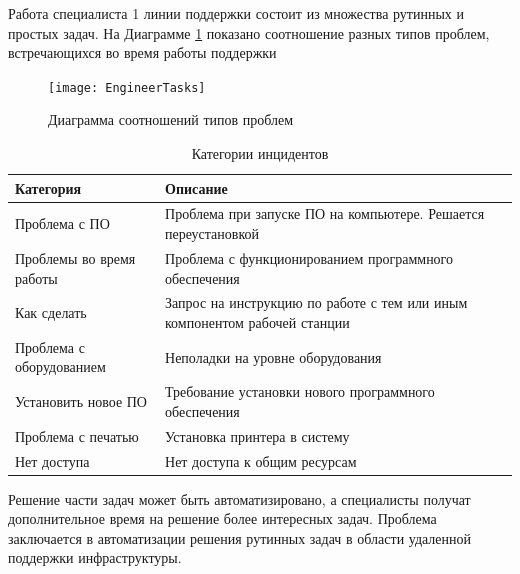 Работа специалиста 1 линии поддержки состоит из множества рутинных и простых задач. На Диаграмме \ref{img:EngineerTasks}  показано соотношение разных типов проблем, встречающихся во время работы поддержки

\begin{figure} [h] 
  \center
  \texttt{[image: EngineerTasks]}
  \caption{Диаграмма соотношений типов проблем} 
  \label{img:EngineerTasks}  
\end{figure}

\begin{table} [htbp]
  \centering
  \parbox{15cm}{\caption{Категории инцидентов}\label{IncidentDescription}}
  \begin{tabular}{| p{7cm} || p{7cm} |}
  \hline
  \hline
Категория & Описание \\
  \hline
Проблема с ПО	& Проблема при запуске ПО на компьютере. Решается переустановкой \\
Проблемы во время работы  & Проблема с функционированием программного обеспечения\\
Как сделать & Запрос на инструкцию по работе с тем или иным компонентом рабочей станции \\
Проблема с оборудованием  & Неполадки на уровне оборудования \\
Установить новое ПО       & Требование установки нового программного обеспечения \\
Проблема с печатью        & Установка принтера в систему \\
Нет доступа               & Нет доступа к общим ресурсам \\
  \hline
  \hline
  \end{tabular}
\end{table}

Решение части задач может быть автоматизировано, а специалисты получат дополнительное время на решение более интересных задач. 
Проблема заключается в автоматизации решения рутинных задач в области удаленной поддержки инфраструктуры.


